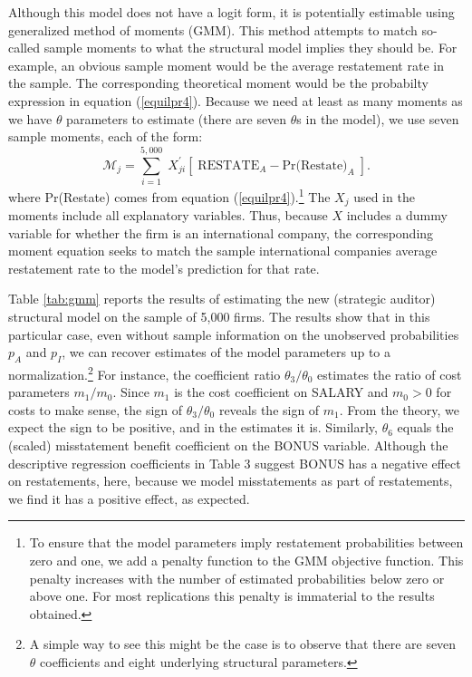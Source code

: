 Although this model does not have a logit form, it is potentially estimable using 
generalized method of moments (GMM).
This method attempts to match so-called sample moments to what the structural model implies they should be. 
For example, an obvious sample moment would be the average restatement rate in the sample.
The corresponding theoretical moment would be the probabilty expression in equation (\ref{equilpr4}).
Because we need at least as many moments as we have $\theta$ parameters to estimate (there are seven $\theta$s in the model), we use seven sample moments, each of the form:
$$ \mathcal{M}_j = \sum_{i=1}^{5,000} \; X_{ji}^\prime\left[\; \mbox{RESTATE}_A - \mbox{Pr(Restate)}_A \; \right]. $$
where Pr(Restate) comes from equation (\ref{equilpr4}).\footnote{
To ensure that the model parameters imply restatement probabilities between zero and one, we add a penalty function to the GMM objective function.
This penalty increases with the number of estimated probabilities below zero or above one.
For most replications this penalty is immaterial to the results obtained.} 
The $X_j$ used in the moments include all explanatory variables. 
Thus, because $X$ includes  a dummy variable for whether the firm is an international company, the corresponding moment equation seeks to match the sample international companies average restatement rate to the model's prediction for that rate.

Table \ref{tab:gmm} reports the results of estimating the new (strategic auditor) structural model on the sample of 5,000 firms. 
The results show that in this particular case, even without sample information on the unobserved probabilities $p_A$ and $p_I$, we can recover estimates of the model parameters up to a normalization.\footnote{
A simple way to see this might be the case is to observe that there are seven $\theta$ coefficients and eight underlying structural parameters.}
For instance, the coefficient ratio $\theta_3/\theta_0$ estimates the ratio of cost parameters $m_1/m_0$.
Since $m_1$ is the cost coefficient on SALARY and $m_0>0$ for costs to make sense, the sign of $\theta_3/\theta_0$ reveals the sign of $m_1$.
From the theory, we expect the sign to be positive, and in the estimates it is. 
Similarly, $\theta_6$ equals the (scaled) misstatement benefit coefficient on the BONUS variable.
Although the descriptive regression coefficients in Table 3 suggest BONUS has a negative effect on restatements, here, because we model misstatements as part of restatements, we find it has a positive effect, as expected.

